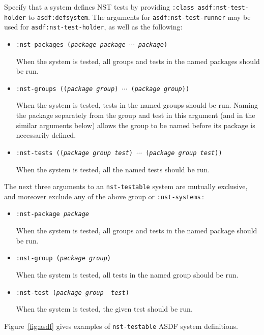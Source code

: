 Specify that a system defines NST tests by providing \texttt{:class
  asdf:nst-test-holder} to \texttt{asdf:defsystem}.  The arguments for
\texttt{asdf:nst-test-runner} may be used for
\texttt{asdf:nst-test-holder}, as well as the following:
\begin{itemize}
\item\texttt{:nst-packages ({\slshape package} {\slshape package}
    $\cdots$ {\slshape package})}\par When the system is tested, all
  groups and tests in the named packages should be run.
\item\texttt{:nst-groups (({\slshape package} {\slshape group})
    $\cdots$ ({\slshape package} {\slshape group}))}\par When the
  system is tested, tests in the named groups should be run.  Naming
  the package separately from the group and test in this argument (and
  in the similar arguments below) allows the group to be named before
  its package is necessarily defined.
\item\texttt{:nst-tests (({\slshape package} {\slshape group}
    {\slshape test}) $\cdots$ ({\slshape package} {\slshape group}
    {\slshape test}))}\par When the system is tested, all the named
  tests should be run.
\end{itemize}
The next three arguments to an \texttt{nst-testable} system are
mutually exclusive, and moreover exclude any of the above group or
\texttt{:nst-systems}\,:
\begin{itemize}
\item\texttt{:nst-package {\slshape package}}\par When the system is
  tested, all groups and tests in the named package should be run.
\item\texttt{:nst-group ({\slshape package} {\slshape group})}\par
  When the system is tested, all tests in the named group should be
  run.
\item\texttt{:nst-test ({\slshape package} {\slshape group} {\slshape
      test})}\par When the system is tested, the given test should be
  run.
\end{itemize}
Figure~\ref{fig:asdf} gives examples of \texttt{nst-testable}
ASDF system definitions.
